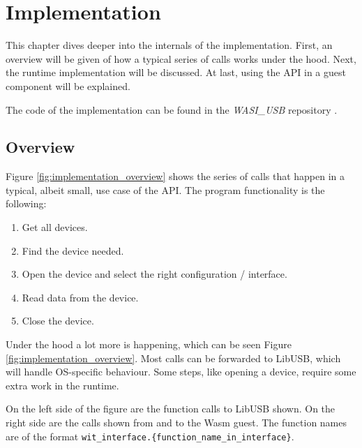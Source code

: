 \chapter{Implementation}
\label{chapter:implementation}
This chapter dives deeper into the internals of the implementation. First, an overview will be given of how a typical series of calls works under the hood. Next, the runtime implementation will be discussed. At last, using the \acrshort{API} in a guest component will be explained.

The code of the implementation can be found in the \textit{WASI\_USB} repository \cite{usb_wasi_impl}.

\section{Overview}

Figure \ref{fig:implementation_overview} shows the series of calls that happen in a typical, albeit small, use case of the API. The program functionality is the following:
\begin{enumerate}
\item Get all devices.
\item Find the device needed.
\item Open the device and select the right configuration / interface.
\item Read data from the device.
\item Close the device.
\end{enumerate}

Under the hood a lot more is happening, which can be seen Figure \ref{fig:implementation_overview}. Most calls can be forwarded to LibUSB, which will handle OS-specific behaviour. Some steps, like opening a device, require some extra work in the runtime.

On the left side of the figure are the function calls to LibUSB shown. On the right side are the calls shown from and to the \acrshort{Wasm} guest. The function names are of the format \texttt{wit\_interface.\{function\_name\_in\_interface\}}.

